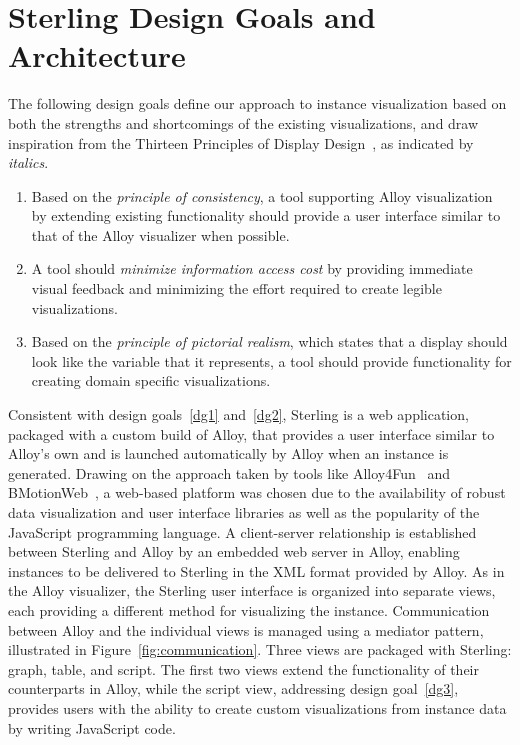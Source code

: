 \documentclass[runningheads]{llncs}
\begin{document}
\section{Sterling Design Goals and Architecture}
\label{sterling}

The following design goals define our approach to instance visualization based on both the strengths and shortcomings of the existing visualizations, and draw inspiration from the Thirteen Principles of Display Design~\cite{}, as indicated by \emph{italics}.

\begin{enumerate}
    \item \label{dg1} Based on the \emph{principle of consistency}, a tool supporting Alloy visualization by extending existing functionality should provide a user interface similar to that of the Alloy visualizer when possible.
    \item \label{dg2} A tool should \emph{minimize information access cost} by providing immediate visual feedback and minimizing the effort required to create legible visualizations.
    \item \label{dg3} Based on the \emph{principle of pictorial realism}, which states that a display should look like the variable that it represents, a tool should provide functionality for creating domain specific visualizations.
\end{enumerate}

Consistent with design goals~\ref{dg1} and~\ref{dg2}, Sterling is a web application, packaged with a custom build of Alloy, that provides a user interface similar to Alloy's own and is launched automatically by Alloy when an instance is generated. 
Drawing on the approach taken by tools like Alloy4Fun~\cite{macedo2019} and BMotionWeb~\cite{ladenberger2016}, a web-based platform was chosen due to the availability of robust data visualization and user interface libraries as well as the popularity of the JavaScript programming language.
A client-server relationship is established between Sterling and Alloy by an embedded web server in Alloy, enabling instances to be delivered to Sterling in the XML format provided by Alloy. 
As in the Alloy visualizer, the Sterling user interface is organized into separate views, each providing a different method for visualizing the instance. 
Communication between Alloy and the individual views is managed using a mediator pattern, illustrated in Figure~\ref{fig:communication}. Three views are packaged with Sterling: graph, table, and script. The first two views extend the functionality of their counterparts in Alloy, while the script view, addressing design goal~\ref{dg3}, provides users with the ability to create custom visualizations from instance data by writing JavaScript code.
\end{document}
